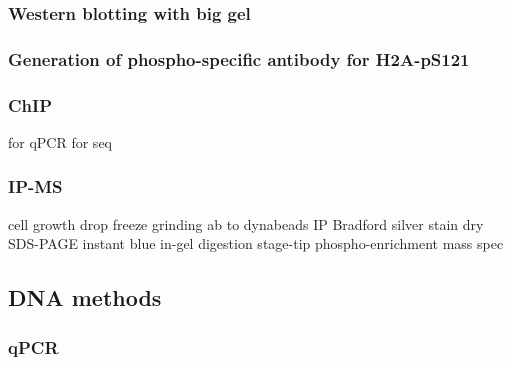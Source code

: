 \subsubsection{Western blotting with big gel}
\subsubsection{Generation of phospho-specific antibody for H2A-pS121}
\subsubsection{ChIP}
for qPCR
for seq
\subsubsection{IP-MS}
cell growth
drop freeze
grinding
ab to dynabeads
IP
Bradford
silver stain
dry SDS-PAGE
instant blue
in-gel digestion
stage-tip
phospho-enrichment
mass spec
\subsection{DNA methods}
\subsubsection{qPCR}

